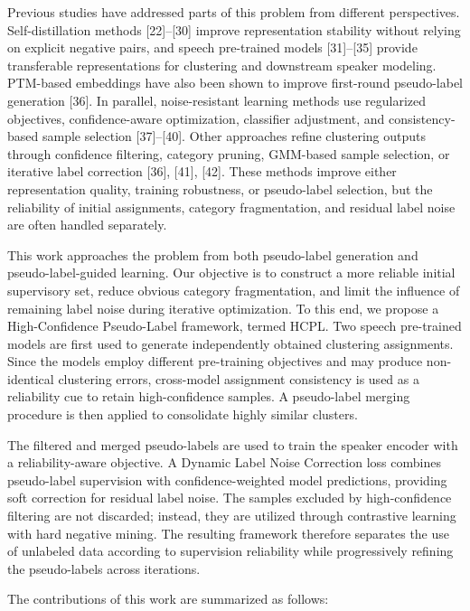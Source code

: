 \documentclass[lettersize,journal]{IEEEtran}
\begin{document}
Previous studies have addressed parts of this problem from different
perspectives. Self-distillation methods [22]--[30] improve
representation stability without relying on explicit negative pairs,
and speech pre-trained models [31]--[35] provide transferable
representations for clustering and downstream speaker modeling.
PTM-based embeddings have also been shown to improve first-round
pseudo-label generation [36]. In parallel, noise-resistant learning
methods use regularized objectives, confidence-aware optimization,
classifier adjustment, and consistency-based sample selection
[37]--[40]. Other approaches refine clustering outputs through
confidence filtering, category pruning, GMM-based sample selection,
or iterative label correction [36], [41], [42]. These methods improve
either representation quality, training robustness, or pseudo-label
selection, but the reliability of initial assignments, category
fragmentation, and residual label noise are often handled separately.

This work approaches the problem from both pseudo-label generation
and pseudo-label-guided learning. Our objective is to construct a
more reliable initial supervisory set, reduce obvious category
fragmentation, and limit the influence of remaining label noise
during iterative optimization. To this end, we propose a
High-Confidence Pseudo-Label framework, termed HCPL. Two speech
pre-trained models are first used to generate independently obtained
clustering assignments. Since the models employ different
pre-training objectives and may produce non-identical clustering
errors, cross-model assignment consistency is used as a reliability
cue to retain high-confidence samples. A pseudo-label merging
procedure is then applied to consolidate highly similar clusters.

The filtered and merged pseudo-labels are used to train the speaker
encoder with a reliability-aware objective. A Dynamic Label Noise
Correction loss combines pseudo-label supervision with
confidence-weighted model predictions, providing soft correction for
residual label noise. The samples excluded by high-confidence
filtering are not discarded; instead, they are utilized through
contrastive learning with hard negative mining. The resulting
framework therefore separates the use of unlabeled data according to
supervision reliability while progressively refining the
pseudo-labels across iterations.

The contributions of this work are summarized as follows:
\end{document}

